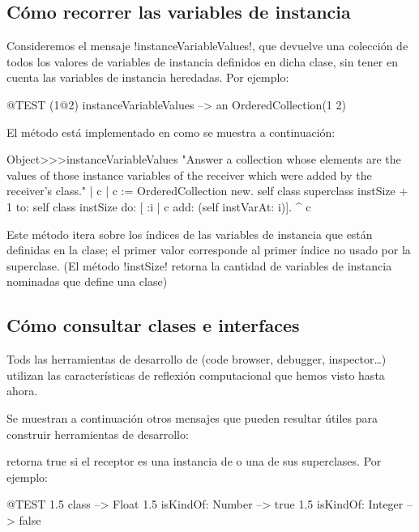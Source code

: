 \documentclass[a4paper,10pt,twoside]{book}
\begin{document}
\subsection{C\'omo recorrer las variables de instancia}

Consideremos el mensaje \ct!instanceVariableValues!, que devuelve una
colecci\'on de todos los valores de variables de instancia definidos en
dicha clase, sin tener en cuenta las variables de instancia
heredadas.  Por ejemplo:
\begin{code}{@TEST}
(1@2) instanceVariableValues --> an OrderedCollection(1 2)
\end{code}

El m\'etodo est\'a implementado en  como se muestra a
continuaci\'on:
\begin{code}{}
Object>>>instanceVariableValues
        "Answer a collection whose elements are the values of those instance variables of the receiver which were added by the receiver's class."
        | c |
        c := OrderedCollection new.
        self class superclass instSize + 1
                to: self class instSize
                do: [ :i | c add: (self instVarAt: i)].
        ^ c
\end{code}

Este m\'etodo itera sobre los \'indices de las variables de instancia que
est\'an definidas en la clase; el primer valor corresponde al primer
\'indice no usado por la superclase.  (El m\'etodo \ct!instSize! retorna
la cantidad de variables de instancia nominadas que define una clase)

\subsection{C\'omo consultar clases e interfaces}

Tods las herramientas de desarrollo de \pharo (code browser,
debugger, inspector\ldots) utilizan las caracter\'isticas de reflexi\'on
computacional que hemos visto hasta ahora.

Se muestran a continuaci\'on otros mensajes que pueden resultar \'utiles
para construir herramientas de desarrollo:

 retorna true si el receptor es una
instancia de  o una de sus superclases.  Por
ejemplo:
\begin{code}{@TEST}
1.5 class                     --> Float
1.5 isKindOf: Number --> true
1.5 isKindOf: Integer   --> false
\end{code}
\end{document}
